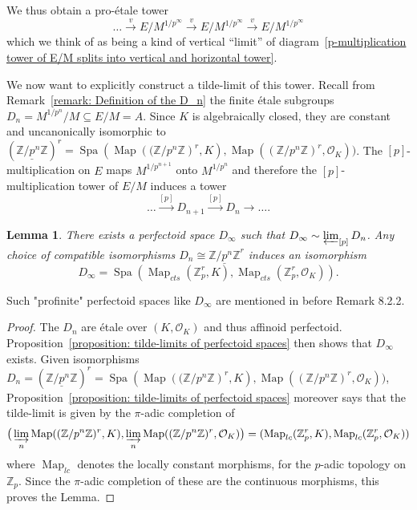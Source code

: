 \documentclass[10pt,oneside]{amsart}
\newtheorem{lemma}[theorem]{Lemma}
\theoremstyle{definition}
\begin{document}
	We thus obtain a pro-\'etale tower
	\begin{equation}\label{proetale tower in the vertical limit}
	\dots \xrightarrow{v}E/M^{1/p^\infty}\xrightarrow{v} E/M^{1/p^\infty}\xrightarrow{v} E/M^{1/p^\infty}
	\end{equation}
	which we think of as being a kind of vertical ``limit'' of diagram~\ref{p-multiplication tower of E/M splits into vertical and horizontal tower}. 
	
	We now want to explicitly construct a tilde-limit of this tower. Recall from Remark~\ref{remark: Definition of the D_n} the finite \'etale subgroups $D_n=M^{1/p^n}/M\subseteq E/M=A$. Since $K$ is algebraically closed, they are constant and uncanonically isomorphic to $(\underline{\mathbb Z/p^{n}\mathbb Z})^{r}=\operatorname{Spa}(\operatorname{Map}(\mathbb (\mathbb Z/p^n\mathbb Z)^r,K),\operatorname{Map}((\mathbb Z/p^n\mathbb Z)^r,\mathcal O_K))$.
	The $[p]$-multiplication on $E$ maps $M^{1/p^{n+1}}$ onto $M^{1/p^{n}}$ and therefore the $[p]$-multiplication tower of $E/M$ induces a tower
	\[\dots \xrightarrow{[p]}D_{n+1}\xrightarrow{[p]}D_n\rightarrow\dots.\]
	
	\begin{lemma}There exists a perfectoid space $D_\infty$ such that $D_\infty\sim\varprojlim_{[p]} D_n$. Any choice of compatible isomorphisms $D_n\cong\underline{\mathbb Z/p^{n}\mathbb Z}^{r}$ induces an isomorphism 
		\[D_\infty = \operatorname {Spa}(\operatorname{Map}_{cts}(\mathbb Z_p^{r},K),\operatorname{Map}_{cts}(\mathbb Z_p^{r},\mathcal O_K)).\]
	\end{lemma}
	
	Such "profinite" perfectoid spaces like $D_\infty$ are mentioned in \cite{berkeley} before Remark 8.2.2.
	\begin{proof}
		The $D_n$ are \'etale over $(K,\mathcal O_K)$ and thus affinoid perfectoid. Proposition~\ref{proposition: tilde-limits of perfectoid spaces} then shows that $D_\infty$ exists. Given isomorphisms $D_n=(\underline{\mathbb Z/p^{n}\mathbb Z})^{r}=\operatorname{Spa}(\operatorname{Map}(\mathbb (\mathbb Z/p^n\mathbb Z)^r,K),\operatorname{Map}((\mathbb Z/p^n\mathbb Z)^r,\mathcal O_K))$, Proposition~\ref{proposition: tilde-limits of perfectoid spaces} moreover says that the tilde-limit is given by the $\pi$-adic completion of 
		\[\big(\varinjlim_n \operatorname{Map}((\mathbb Z/p^n\mathbb Z)^r,K),\varinjlim_n \operatorname{Map}((\mathbb Z/p^n\mathbb Z)^r,\mathcal O_K)\big) = (\operatorname{Map}_{lc}(\mathbb Z_p^r,K),\operatorname{Map}_{lc}(\mathbb Z_p^r,\mathcal O_K))\]
		where $\operatorname{Map}_{lc}$ denotes the locally constant morphisms, for the $p$-adic topology on $\mathbb Z_p$. Since the $\pi$-adic completion of these are the continuous morphisms, this proves the Lemma.
	\end{proof}
	
\end{document}
